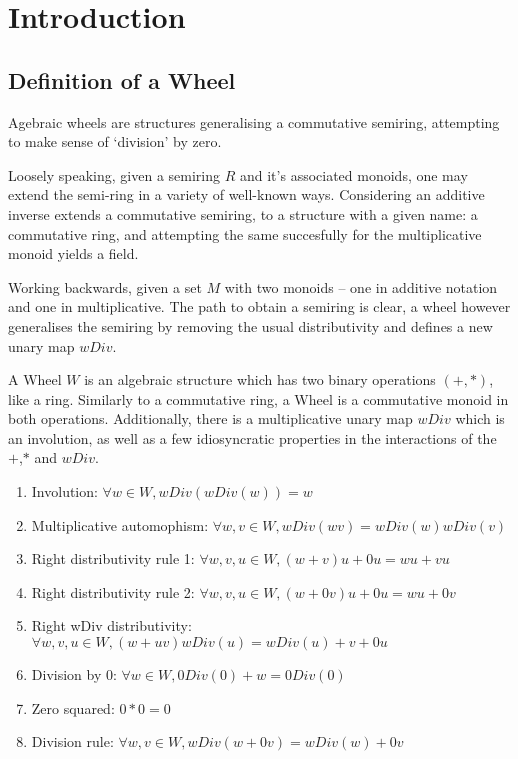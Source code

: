 %
\chapter{Introduction}
\section{Definition of a Wheel}
Agebraic wheels are structures generalising a commutative semiring, attempting to make sense of  `division' by zero. \par
Loosely speaking, given a semiring $R$ and it's associated monoids, one may extend the semi-ring in a variety of well-known ways. Considering an additive inverse extends a commutative semiring, to a structure with a given name: a commutative ring, and attempting the same succesfully for the multiplicative monoid yields a field. \par
Working backwards, given a set $M$ with two monoids -- one in additive notation and one in multiplicative. The path to obtain a semiring is clear,  a wheel however generalises the semiring by removing the usual distributivity and defines a new unary map $wDiv$.
\begin{definition}
  \label{def:Wheel}
  \leanok
A Wheel $W$ is an algebraic structure which has two binary operations $(+,*)$, like a ring.
Similarly to a commutative ring, a Wheel is a commutative monoid in both operations. Additionally,
there is a multiplicative unary map $wDiv$  which is an involution, as well as a few idiosyncratic
properties in the interactions of the $+$,$*$ and $wDiv$.
  \begin{enumerate}
  \item Involution: $\forall w \in W, wDiv(wDiv(w)) = w$ 
  \item Multiplicative automophism: $\forall w, v \in W, wDiv(wv) = wDiv(w)wDiv(v)$
  \item Right distributivity rule 1: $\forall w, v, u \in W, (w + v)u + 0u= wu + vu$
  \item Right distributivity rule 2: $\forall w, v, u \in W, (w + 0v)u + 0u= wu + 0v$
  \item Right wDiv distributivity: $\forall w, v, u \in W, (w + uv)wDiv(u) = wDiv(u)+ v+0u$
  \item Division by 0: $\forall w \in W, 0Div(0) + w = 0Div(0)$
  \item Zero squared: $0*0 = 0$
  \item Division rule: $\forall w, v \in W, wDiv(w + 0v) = wDiv(w) +0v$
  \end{enumerate}
\end{definition}
